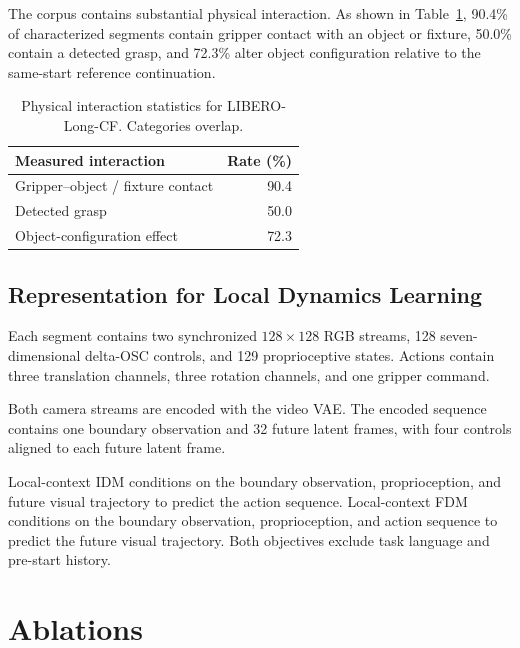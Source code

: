 The corpus contains substantial physical interaction. As shown in
Table~\ref{tab:libero-cf-interaction}, 90.4\% of characterized segments contain
gripper contact with an object or fixture, 50.0\% contain a detected grasp,
and 72.3\% alter object configuration relative to the same-start reference
continuation.

\begin{table}[t]
    \centering
    \caption{
    Physical interaction statistics for LIBERO-Long-CF. Categories overlap.
    }
    \label{tab:libero-cf-interaction}
    \small
    \begin{tabular}{@{}lr@{}}
        \toprule
        \textbf{Measured interaction}
        & \textbf{Rate (\%)} \\
        \midrule
        Gripper--object / fixture contact
        & 90.4 \\
        Detected grasp
        & 50.0 \\
        Object-configuration effect
        & 72.3 \\
        \bottomrule
    \end{tabular}
\end{table}

\subsection{Representation for Local Dynamics Learning}
\label{app:libero-cf-representation}

Each segment contains two synchronized $128\times128$ RGB streams,
128 seven-dimensional delta-OSC controls, and 129 proprioceptive states.
Actions contain three translation channels, three rotation channels, and one
gripper command.

Both camera streams are encoded with the \ours video VAE. The encoded
sequence contains one boundary observation and 32 future latent frames, with
four controls aligned to each future latent frame.

Local-context IDM conditions on the boundary observation, proprioception, and
future visual trajectory to predict the action sequence. Local-context FDM
conditions on the boundary observation, proprioception, and action sequence to
predict the future visual trajectory. Both objectives exclude task language
and pre-start history.

\section{Ablations}
